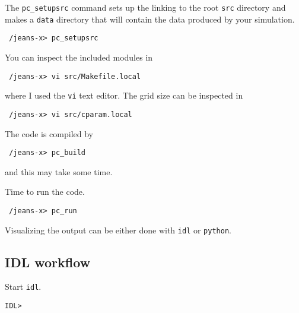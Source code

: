 \documentclass[a4paper,12pt]{article}
\begin{document}
The \verb|pc_setupsrc| command sets up the linking to the root \verb|src|
directory and makes a
\verb|data| directory that will contain the data produced by your simulation.
\begin{verbatim}
 /jeans-x> pc_setupsrc
\end{verbatim}

You can inspect the included modules in
\begin{verbatim}
 /jeans-x> vi src/Makefile.local 
\end{verbatim}
where I used the \verb|vi| text editor. The grid size can be inspected in 
\begin{verbatim}
 /jeans-x> vi src/cparam.local 
\end{verbatim}

The code is compiled by
\begin{verbatim}
 /jeans-x> pc_build
\end{verbatim}
and this may take some time.

Time to run the code. 
\begin{verbatim}
 /jeans-x> pc_run
\end{verbatim}

Visualizing the output can be either done with \verb|idl| or \verb|python|.

\subsection{IDL workflow}
Start \verb|idl|.
\begin{verbatim}
IDL>
\end{verbatim}
\end{document}
